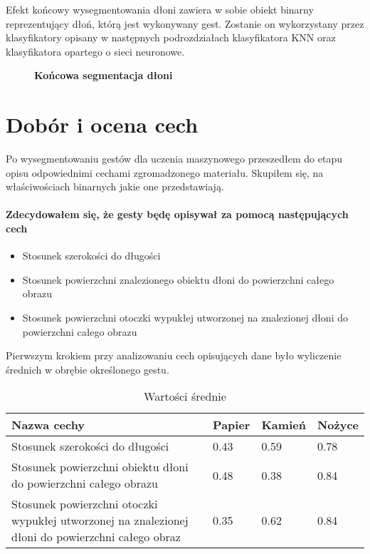 \documentclass[a4paper,12pt,twoside,openany]{report}
\newcommand{\ImgPath}{.}
\begin{document}
Efekt końcowy wysegmentowania dłoni zawiera w sobie obiekt binarny reprezentujący dłoń, którą jest wykonywany gest.
Zostanie on wykorzystany przez klasyfikatory opisany w następnych podrozdziałach klasyfikatora KNN oraz klasyfikatora opartego o sieci neuronowe.
\begin{figure}[H]
	\centering
	\caption{  \textbf{Końcowa segmentacja dłoni}}
\end{figure} 

\section{Dobór i ocena cech}
Po wysegmentowaniu gestów dla uczenia maszynowego przeszedłem do etapu opisu odpowiednimi cechami zgromadzonego materiału. Skupiłem się, na właściwościach binarnych jakie one przedstawiają.

\paragraph{Zdecydowałem się, że gesty będę opisywał za pomocą następujących cech}
\begin{itemize}
	\item Stosunek szerokości do długości 
	\item Stosunek powierzchni znalezionego obiektu dłoni do powierzchni całego obrazu
	\item Stosunek powierzchni otoczki wypukłej utworzonej na znalezionej dłoni do powierzchni całego obrazu
\end{itemize}

Pierwszym krokiem przy analizowaniu cech opisujących dane było wyliczenie średnich w obrębie określonego gestu.

\begin{table}[H]
	\centering
	\begin{tabularx}{\textwidth}{|X|l|l|l|}
		\hline
		\textbf{Nazwa cechy} & \textbf{Papier} & \textbf{Kamień} & \textbf{Nożyce} \\ 
		
		\hline
		Stosunek szerokości do długości & 0.43 & 0.59 & 0.78 \\ 
		
		\hline
		Stosunek powierzchni obiektu dłoni do powierzchni całego obrazu & 0.48 & 0.38 & 0.84 \\ 
		
		\hline
		Stosunek powierzchni otoczki wypukłej utworzonej na znalezionej dłoni do powierzchni całego obraz & 0.35 & 0.62 & 0.84 \\ 
		\hline
	\end{tabularx}

	\caption{Wartości średnie}
\end{table}
\end{document}
